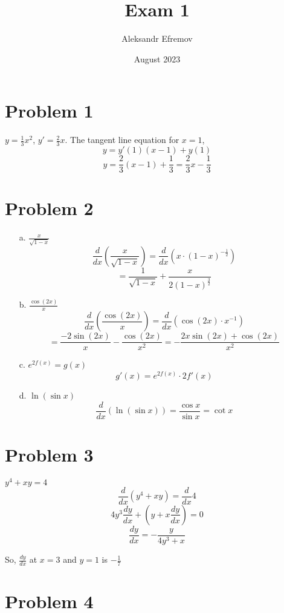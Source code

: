 \documentclass{article}
\title{Exam 1}
\author{Aleksandr Efremov}
\date{August 2023}
\begin{document}
\maketitle

\section{Problem 1}
$y = \frac{1}{3}x^2$, $y' = \frac{2}{3}x$.
The tangent line equation for $x = 1$,
\[ y = y'(1)(x-1) + y(1)\]
\[ y = \frac{2}{3}(x-1)+\frac{1}{3} =  \frac{2}{3}x - \frac{1}{3}\]

\section{Problem 2}
\begin{itemize}
    \item[a.] $\frac{x}{\sqrt{1-x}}$
    \[ \frac{d}{dx} \left( \frac{x}{\sqrt{1-x}}  \right) = \frac{d}{dx} \left( x \cdot (1-x)^{-\frac{1}{2}} \right) \]
    \[ = \frac{1}{\sqrt{1-x}} + \frac{x}{2(1-x)^{\frac{3}{2}}}\]
    \item[b.] $\frac{\cos{(2x)}}{x}$
    \[ \frac{d}{dx} \left( \frac{\cos{(2x)}}{x} \right) = \frac{d}{dx} \left( \cos{(2x)} \cdot x^{-1} \right) \]
    \[ = \frac{-2\sin{(2x)}}{x} - \frac{\cos{(2x)}}{x^2} = -\frac{2x\sin{(2x)+\cos{(2x)}}}{x^2}\]
    \item[c.] $e^{2f(x)} = g(x)$
    \[ g'(x) = e^{2f(x)} \cdot 2f'(x) \]
    \item[d.] $\ln{(\sin{x})}$
    \[ \frac{d}{dx} \left( \ln{(\sin{x})} \right) = \frac{\cos{x}}{\sin{x}} = \cot{x} \]
\end{itemize}

\section{Problem 3}
$y^4 + xy = 4$
\[ \frac{d}{dx} \left( y^4 + xy \right) = \frac{d}{dx} 4\]
\[ 4y^3\frac{dy}{dx} + \left( y + x\frac{dy}{dx} \right) = 0 \]
\[ \frac{dy}{dx} = -\frac{y}{4y^3+x} \]

So, $\frac{dy}{dx}$ at $x = 3$ and $y = 1$ is $-\frac{1}{7}$

\section{Problem 4}
\begin{figure}[htp!]
    \centering
    
    \label{fig:fig1}
\end{figure}
\end{document}

